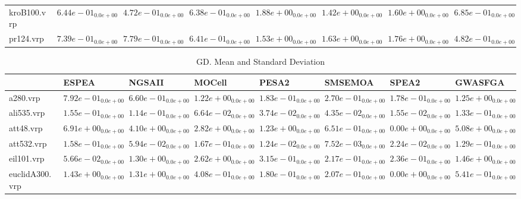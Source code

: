 \documentclass{article}
\begin{document}
\begin{table}
\begin{scriptsize}
\begin{tabular}{llllllll}
kroB100.vrp & $  6.44e-01_{ 0.0e+00}$ & \cellcolor{gray95}$  4.72e-01_{ 0.0e+00}$ & \cellcolor{gray25}$  6.38e-01_{ 0.0e+00}$ & $  1.88e+00_{ 0.0e+00}$ & $  1.42e+00_{ 0.0e+00}$ & $  1.60e+00_{ 0.0e+00}$ & $  6.85e-01_{ 0.0e+00}$ \\
pr124.vrp & $  7.39e-01_{ 0.0e+00}$ & $  7.79e-01_{ 0.0e+00}$ & \cellcolor{gray25}$  6.41e-01_{ 0.0e+00}$ & $  1.53e+00_{ 0.0e+00}$ & $  1.63e+00_{ 0.0e+00}$ & $  1.76e+00_{ 0.0e+00}$ & \cellcolor{gray95}$  4.82e-01_{ 0.0e+00}$ \\
\hline
\end{tabular}
\end{scriptsize}
\end{table}

\begin{table}
\caption{GD. Mean and Standard Deviation}
\label{table: GD}
\centering
\begin{scriptsize}
\begin{tabular}{llllllll}
\hline & ESPEA & NGSAII & MOCell & PESA2 & SMSEMOA & SPEA2 &  GWASFGA\\
\hline 
a280.vrp & $  7.92e-01_{ 0.0e+00}$ & $  6.60e-01_{ 0.0e+00}$ & $  1.22e+00_{ 0.0e+00}$ & \cellcolor{gray25}$  1.83e-01_{ 0.0e+00}$ & $  2.70e-01_{ 0.0e+00}$ & \cellcolor{gray95}$  1.78e-01_{ 0.0e+00}$ & $  1.25e+00_{ 0.0e+00}$ \\
ali535.vrp & $  1.55e-01_{ 0.0e+00}$ & $  1.14e-01_{ 0.0e+00}$ & $  6.64e-02_{ 0.0e+00}$ & \cellcolor{gray25}$  3.74e-02_{ 0.0e+00}$ & $  4.35e-02_{ 0.0e+00}$ & \cellcolor{gray95}$  1.55e-02_{ 0.0e+00}$ & $  1.33e-01_{ 0.0e+00}$ \\
att48.vrp & $  6.91e+00_{ 0.0e+00}$ & $  4.10e+00_{ 0.0e+00}$ & $  2.82e+00_{ 0.0e+00}$ & $  1.23e+00_{ 0.0e+00}$ & \cellcolor{gray25}$  6.51e-01_{ 0.0e+00}$ & \cellcolor{gray95}$  0.00e+00_{ 0.0e+00}$ & $  5.08e+00_{ 0.0e+00}$ \\
att532.vrp & $  1.58e-01_{ 0.0e+00}$ & $  5.94e-02_{ 0.0e+00}$ & $  1.67e-01_{ 0.0e+00}$ & \cellcolor{gray25}$  1.24e-02_{ 0.0e+00}$ & \cellcolor{gray95}$  7.52e-03_{ 0.0e+00}$ & $  2.24e-02_{ 0.0e+00}$ & $  1.29e-01_{ 0.0e+00}$ \\
eil101.vrp & \cellcolor{gray95}$  5.66e-02_{ 0.0e+00}$ & $  1.30e+00_{ 0.0e+00}$ & $  2.62e+00_{ 0.0e+00}$ & $  3.15e-01_{ 0.0e+00}$ & \cellcolor{gray25}$  2.17e-01_{ 0.0e+00}$ & $  2.36e-01_{ 0.0e+00}$ & $  1.46e+00_{ 0.0e+00}$ \\
euclidA300.vrp & $  1.43e+00_{ 0.0e+00}$ & $  1.31e+00_{ 0.0e+00}$ & $  4.08e-01_{ 0.0e+00}$ & \cellcolor{gray25}$  1.80e-01_{ 0.0e+00}$ & $  2.07e-01_{ 0.0e+00}$ & \cellcolor{gray95}$  0.00e+00_{ 0.0e+00}$ & $  5.41e-01_{ 0.0e+00}$ \\

\end{tabular}
\end{scriptsize}
\end{table}
\end{document}
